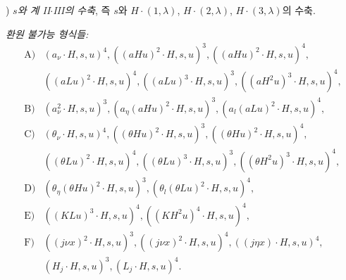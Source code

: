 
) \emph{$s$와 계 II$\cdot$III의 수축},
즉 $s$와 $H\cdot(1,\lambda)$, $H\cdot(2,\lambda)$, $H\cdot(3,\lambda)$의 수축.

\noindent\emph{환원 불가능 형식들:}
\[
\begin{array}{rl}
\text{A)}&(a_\nu\cdot H,s,u)^4,
((aHu)^2\cdot H,s,u)^3,
((aHu)^2\cdot H,s,u)^4,\\[0.25em]
&((aLu)^2\cdot H,s,u)^4,
((aLu)^3\cdot H,s,u)^3,
((aH^2u)^3\cdot H,s,u)^4,\\[0.45em]
\text{B)}&(a_\nu^2\cdot H,s,u)^3,
(a_\eta(aHu)^2\cdot H,s,u)^3,
(a_l(aLu)^2\cdot H,s,u)^4,\\[0.45em]
\text{C)}&(\theta_\nu\cdot H,s,u)^4,
((\theta Hu)^2\cdot H,s,u)^3,
((\theta Hu)^2\cdot H,s,u)^4,\\[0.25em]
&((\theta Lu)^2\cdot H,s,u)^4,
((\theta Lu)^3\cdot H,s,u)^3,
((\theta H^2u)^3\cdot H,s,u)^4,\\[0.45em]
\text{D)}&(\theta_\eta(\theta Hu)^2\cdot H,s,u)^3,
(\theta_l(\theta Lu)^2\cdot H,s,u)^4,\\[0.45em]
\text{E)}&((KLu)^3\cdot H,s,u)^4,
((KH^2u)^4\cdot H,s,u)^4,\\[0.45em]
\text{F)}&((j\nu x)^2\cdot H,s,u)^3,
((j\nu x)^2\cdot H,s,u)^4,
((j\eta x)\cdot H,s,u)^4,\\[0.25em]
&(H_j\cdot H,s,u)^3,
(L_j\cdot H,s,u)^4.
\end{array}
\]
